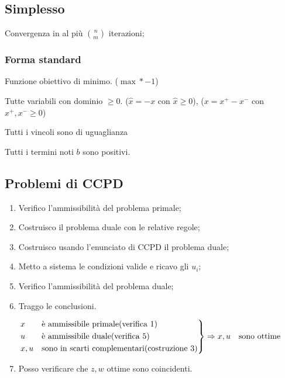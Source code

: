 \begin{multicols}{2}
\subsection*{Simplesso}
Convergenza in al più $\binom{n}{m}$ iterazioni;

\subsubsection*{Forma standard}
Funzione obiettivo di minimo. ($\max * -1$)

Tutte variabili con dominio $\geq 0$. ($\hat{x} = -x$ con $\hat{x}\geq0$), ($x =x^+ - x^-$ con $ x^+,x^- \geq 0$)

Tutti i vincoli sono di uguaglianza

Tutti i termini noti $b$ sono positivi.


\subsection*{Problemi di CCPD}
\begin{enumerate}
    \item Verifico l'ammissibilità del problema primale;
    \item Costruisco il problema duale con le relative regole;
    \item Costruisco usando l'enunciato di CCPD il problema duale;
    \item Metto a sistema le condizioni valide e ricavo gli $u_i$;
    \item Verifico l'ammissibilità del problema duale;
    \item Traggo le conclusioni.
    
    \fontsize{6}{12}\selectfont
    $
    \begin{rcases}
    x & \textrm{è ammissibile primale(verifica 1)}\\
    u & \textrm{è ammissibile duale(verifica 5)}\\
    x,u & \textrm{sono in scarti complementari(costruzione 3)}
    \end{rcases} 
    \Rightarrow
    x,u \quad \textrm{sono ottime}      
    $
    \fontsize{8}{12}\selectfont

    \item Posso verificare che $z,w$ ottime sono coincidenti.
\end{enumerate}


\end{multicols}
